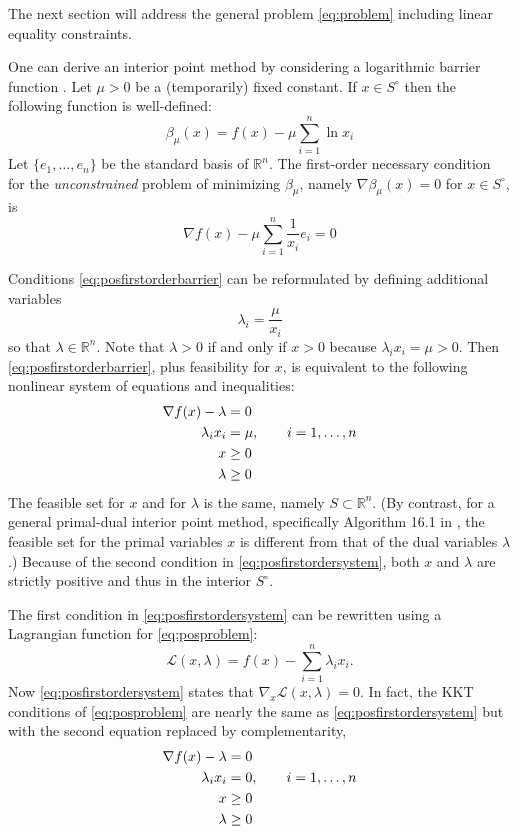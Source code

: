 \documentclass[11pt]{article}
\newcommand{\RR}{\mathbb{R}}
\newcommand{\grad}{\nabla}
\begin{document}
The next section will address the general problem \eqref{eq:problem} including linear equality constraints.

One can derive an interior point method by considering a logarithmic barrier function \cite[section 16.2]{GrivaNashSofer2009}.  Let $\mu>0$ be a (temporarily) fixed constant.  If $x\in S^\circ$ then the following function is well-defined:
\begin{equation}
\beta_\mu(x) = f(x) - \mu \sum_{i=1}^n \ln x_i \label{eq:posbarrierfunction}
\end{equation}
Let $\{e_1,\dots,e_n\}$ be the standard basis of $\RR^n$.  The first-order necessary condition for the \emph{unconstrained} problem of minimizing $\beta_\mu$, namely $\grad \beta_\mu(x)=0$ for $x \in S^\circ$, is
\begin{equation}
\grad f(x) - \mu \sum_{i=1}^n \frac{1}{x_i} e_i = 0 \label{eq:posfirstorderbarrier}
\end{equation}

Conditions \eqref{eq:posfirstorderbarrier} can be reformulated by defining additional variables
    $$\lambda_i = \frac{\mu}{x_i}$$
so that $\lambda\in\RR^n$.  Note that $\lambda>0$ if and only if $x>0$ because $\lambda_i x_i = \mu > 0$.  Then \eqref{eq:posfirstorderbarrier}, plus feasibility for $x$, is equivalent to the following nonlinear system of equations and inequalities:
\begin{align}
\grad f(x) - \lambda &= 0 \label{eq:posfirstordersystem} \\
\lambda_i x_i &= \mu, \qquad i=1,\dots,n \notag \\
x &\ge 0 \notag \\
\lambda &\ge 0 \notag
\end{align}
The feasible set for $x$ and for $\lambda$ is the same, namely $S \subset \RR^n$.   (By contrast, for a general primal-dual interior point method, specifically Algorithm 16.1 in \cite[section 16.7]{GrivaNashSofer2009}, the feasible set for the primal variables $x$ is different from that of the dual variables $\lambda$.)  Because of the second condition in \eqref{eq:posfirstordersystem}, both $x$ and $\lambda$ are strictly positive and thus in the interior $S^\circ$.

The first condition in \eqref{eq:posfirstordersystem} can be rewritten using a Lagrangian function for \eqref{eq:posproblem}:
\begin{equation}
\mathcal{L}(x,\lambda) = f(x) - \sum_{i=1}^n \lambda_i x_i.  \label{eq:poslagrangian}
\end{equation}
Now \eqref{eq:posfirstordersystem} states that $\grad_x \mathcal{L}(x,\lambda)=0$.  In fact, the KKT conditions \cite[sections 14.4, 14.5]{GrivaNashSofer2009} of \eqref{eq:posproblem} are nearly the same as \eqref{eq:posfirstordersystem} but with the second equation replaced by complementarity,
\begin{align}
\grad f(x) - \lambda &= 0 \label{eq:poskkt} \\
\lambda_i x_i &= 0, \qquad i=1,\dots,n \notag \\
x &\ge 0 \notag \\
\lambda &\ge 0 \notag
\end{align}
\end{document}
